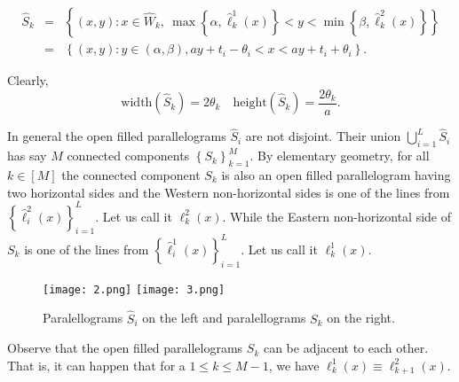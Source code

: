 \documentclass[amssymb,amsfonts,12pt,verbatim,righttag,oneside]{amsart}
\numberwithin{equation}{section} %
\theoremstyle{plain}
\theoremstyle{plain}
\begin{document}
\begin{eqnarray}
\label{y71}
\widehat{S}_k &=&
\left\{ (x,y): x\in \widehat{W}_k,\
\max\left\{ \alpha ,\widehat{\ell }_k^1(x) \right\}< y < \min\left\{ \beta ,\widehat{\ell }_k^2(x) \right\}\right\} \\ \nonumber
&=& \left\{ (x,y): y\in (\alpha ,\beta ), ay+t_i-\theta _i<x<ay+t_i+\theta _i \right\}.
\end{eqnarray}

Clearly,
\begin{equation}
\label{z46}
\mathrm{width}(\widehat{S}_k)=2\theta_k\quad
\mathrm{height}(\widehat{S}_k)=\frac{2\theta_k}{a}.
\end{equation}


In general the open filled parallelograms $\widehat{S}_i$ are not disjoint.
Their union $\bigcup\limits _{i=1}^{L}\widehat{S}_i$ has say $M$ connected components
$\left\{ S_k \right\}_{k=1}^M$. By elementary geometry, for all $k\in[M]$ the connected component $S_k$ is also an open filled parallelogram having two horizontal sides and the Western non-horizontal sides is one of the lines from
$\left\{ \widehat{\ell }_i^2(x) \right\}_{i=1}^{L } $. Let us call it
$\ell _{k }^{2 }(x)$. While the Eastern non-horizontal side of $S_k$ is one of the lines from $\left\{ \widehat{\ell }_i^1(x) \right\}_{i=1}^{L } $. Let us call it
$\ell _{k }^{1 }(x)$.


\begin{figure}[ht!]
  \begin{center}
   \texttt{[image: 2.png]}
  \texttt{[image: 3.png]}
  \end{center}
  \caption{Paralellograms $\widehat{S}_i$ on the left and paralellograms
  $S_k$ on the right.}\label{y92}
\end{figure}


Observe that the open filled parallelograms $S_k$ can be adjacent to each other. That is, it can happen that
for a $1\leq k\leq  M-1$, we have $\ell _{k}^{1 }(x)\equiv \ell _{k+1}^{2 }(x)$.
\end{document}
